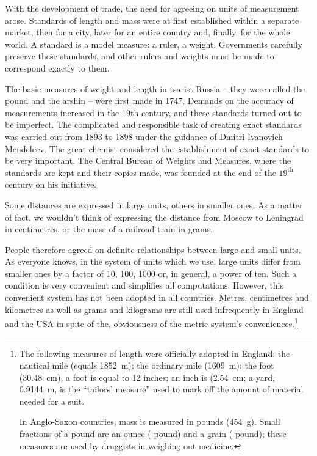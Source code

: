 With the development of trade, the need for agreeing on
units of measurement arose. Standards of length and mass were at first
established within a separate market, then for a city, later for an
entire country and, finally, for the whole world. A standard is a
model measure: a ruler, a weight. Governments carefully preserve these
standards, and other rulers and weights must be made to correspond
exactly to them.  

The basic measures of weight and length in tsarist Russia -- they were called the pound and the arshin -- were first made in 1747. Demands on the accuracy of measurements increased in the 19th century, and these standards turned out to be imperfect. The complicated and responsible task of creating exact standards was carried out from 1893 to 1898 under the guidance of Dmitri Ivanovich Mendeleev. The great chemist considered the establishment of exact standards to be very important. The Central Bureau of Weights and Measures, where the standards are kept and their copies made, was founded at the end of the $19^{\textrm{th}}$ century on his initiative.  

Some distances are expressed in large units, others in smaller
ones. As a matter of fact, we wouldn't think of expressing the
distance from Moscow to Leningrad in centimetres, or the mass of a
railroad train in grams.

People therefore agreed on definite relationships between large and
small units. As everyone knows, in the system of units which we use, large units differ from smaller ones by a factor of 10, 100, 1000 or, in general, a power of ten.  Such a condition is very convenient and simplifies all computations. However, this convenient system has not been adopted in all countries. Metres, centimetres and kilometres as well as grams and kilograms are still used infrequently in England and the USA in spite of the, obviousness of the metric system's conveniences.\footnote{The following measures of length were officially adopted in England: the nautical mile (equals \SI{1852}{\meter}); the ordinary mile (\SI{1609}{\meter}): the foot (\SI{30.48}{\centi\meter}), a foot is equal to 12 inches; an inch is (\SI{2.54}{\centi\meter}; a yard, \SI{0.9144}{\meter}, is the ``tailors'
measure'' used to mark off the amount of material needed for a suit.

In Anglo-Saxon countries, mass is measured in pounds (\SI{454}{\gram}). Small
fractions of a pound are an ounce ( pound) and a grain (
pound); these measures are used by druggists in weighing out
medicine.}

